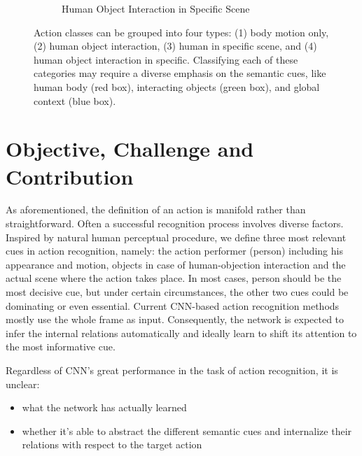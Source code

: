 \begin{figure}
\begin{subfigure}{0.5\linewidth}
\caption{Human Object Interaction in Specific Scene}
\end{subfigure}
\caption[Categorization of Actions according to Semantic Composition]{Action classes can be grouped into four types: (1) body motion only, (2) human object interaction, (3) human in specific scene, and (4) human object interaction in specific. Classifying each of these categories may require a diverse emphasis on the semantic cues, like human body (red box), interacting objects (green box), and global context (blue box).}\label{fig:categories}
\end{figure}
\section{Objective, Challenge and Contribution}
As aforementioned, the definition of an action is manifold rather than straightforward. Often a successful recognition process involves diverse factors. 
Inspired by natural human perceptual procedure, we define three most relevant cues in action recognition, namely: the action performer (person) including his appearance and motion, objects in case of human-objection interaction and the actual scene where the action takes place. 
In most cases, person should be the most decisive cue, but under certain circumstances, the other two cues could be dominating or even essential. 
Current CNN-based action recognition methods mostly use the whole frame as input. Consequently, the network is expected to infer the internal relations automatically and ideally learn to shift its attention to the most informative cue.

Regardless of CNN's great performance in the task of action recognition, it is unclear: 
\begin{itemize}
\item what the network has actually learned
\item whether it's able to abstract the different semantic cues and internalize their relations with respect to the target action
\end{itemize}

